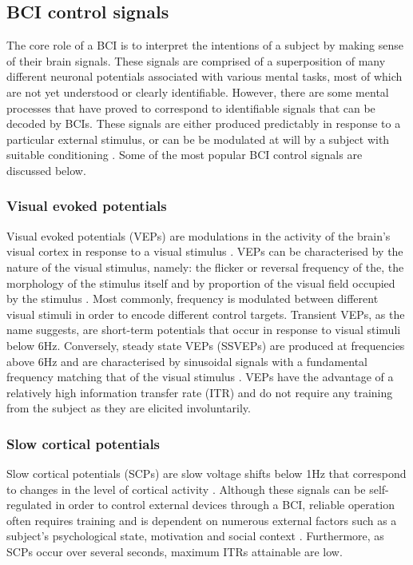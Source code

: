 \subsection{BCI control signals}
The core role of a BCI is to interpret the intentions of a subject by making sense of their brain signals. These signals are comprised of a superposition of many different neuronal potentials associated with various mental tasks, most of which are not yet understood or clearly identifiable. However, there are some mental processes that have proved to correspond to identifiable signals that can be decoded by BCIs. These signals are either produced predictably in response to a particular external stimulus, or can be be modulated at will by a subject with suitable conditioning \cite{bci-survey-nicolas-alonso}. Some of the most popular BCI control signals are discussed below.

\subsubsection{Visual evoked potentials}
Visual evoked potentials (VEPs) are modulations in the activity of the brain's visual cortex in response to a visual stimulus \cite{bromm-veps}. VEPs can be characterised by the nature of the visual stimulus, namely: the flicker or reversal frequency of the, the morphology of the stimulus itself and by proportion of the visual field occupied by the stimulus \cite{bci-survey-nicolas-alonso}. Most commonly, frequency is modulated between different visual stimuli in order to encode different control targets. Transient VEPs, as the name suggests, are short-term potentials that occur in response to visual stimuli below 6Hz. Conversely, steady state VEPs (SSVEPs) are produced at frequencies above 6Hz and are characterised by sinusoidal signals with a fundamental frequency matching that of the visual stimulus \cite{Xie2016}. VEPs have the advantage of a relatively high information transfer rate (ITR) and do not require any training from the subject as they are elicited involuntarily. 

\subsubsection{Slow cortical potentials}
Slow cortical potentials (SCPs) are slow voltage shifts below 1Hz that correspond to changes in the level of cortical activity \cite{bci-survey-nicolas-alonso}. Although these signals can be self-regulated in order to control external devices through a BCI, reliable operation often requires training and is dependent on numerous external factors such as a subject's psychological state, motivation and social context \cite{bci-survey-nicolas-alonso}. Furthermore, as SCPs occur over several seconds, maximum ITRs attainable are low.

